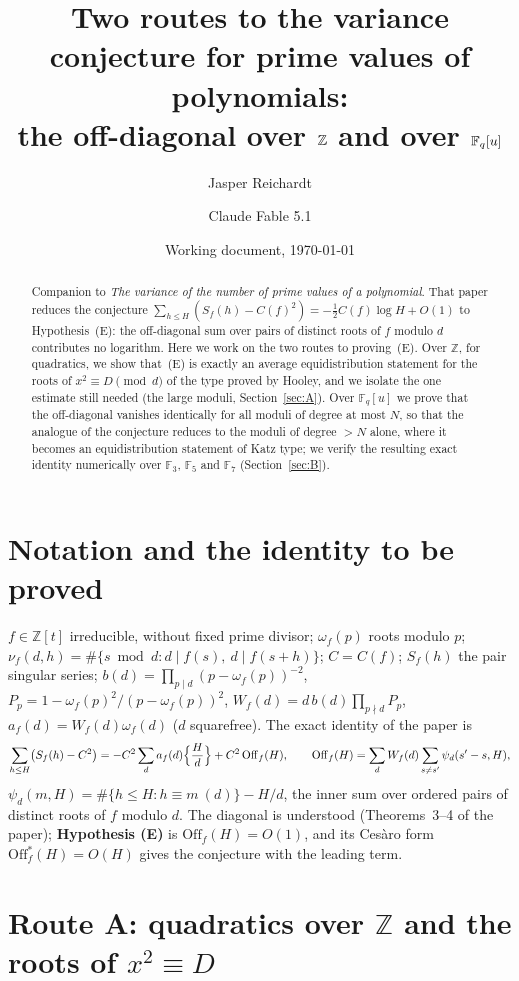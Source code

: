 \documentclass[11pt,a4paper]{article}
\title{Two routes to the variance conjecture for prime values of polynomials:\\
the off-diagonal over $\Z$ and over $\F_q[u]$}
\author{Jasper Reichardt \and Claude Fable 5.1}
\date{Working document, \today}
\newcommand{\Z}{\mathbb{Z}}
\newcommand{\F}{\mathbb{F}}
\newcommand{\Off}{\mathrm{Off}}
\begin{document}
\maketitle

\begin{abstract}
Companion to \emph{The variance of the number of prime values of a polynomial}. That paper reduces the
conjecture $\sum_{h\le H}(S_f(h)-C(f)^2)=-\tfrac12C(f)\log H+O(1)$ to Hypothesis~(E): the off-diagonal
sum over pairs of distinct roots of $f$ modulo $d$ contributes no logarithm. Here we work on the two
routes to proving~(E). Over $\Z$, for quadratics, we show that~(E) is exactly an average
equidistribution statement for the roots of $x^2\equiv D\pmod d$ of the type proved by Hooley, and we
isolate the one estimate still needed (the large moduli, Section~\ref{sec:A}). Over $\F_q[u]$ we prove
that the off-diagonal vanishes identically for all moduli of degree at most $N$, so that the analogue
of the conjecture reduces to the moduli of degree $>N$ alone, where it becomes an equidistribution
statement of Katz type; we verify the resulting exact identity numerically over $\F_3$, $\F_5$ and
$\F_7$ (Section~\ref{sec:B}).
\end{abstract}

\section{Notation and the identity to be proved}

$f\in\Z[t]$ irreducible, without fixed prime divisor; $\omega_f(p)$ roots modulo $p$;
$\nu_f(d,h)=\#\{s\bmod d: d\mid f(s),\ d\mid f(s+h)\}$; $C=C(f)$; $S_f(h)$ the pair singular series;
$b(d)=\prod_{p\mid d}(p-\omega_f(p))^{-2}$, $P_p=1-\omega_f(p)^2/(p-\omega_f(p))^2$,
$W_f(d)=d\,b(d)\prod_{p\nmid d}P_p$, $a_f(d)=W_f(d)\omega_f(d)$ ($d$ squarefree). The exact identity
of the paper is
\begin{equation}\label{eq:id}
\sum_{h\le H}\bigl(S_f(h)-C^2\bigr)=-C^2\sum_{d}a_f(d)\Bigl\{\frac Hd\Bigr\}+C^2\,\Off_f(H),\qquad
\Off_f(H)=\sum_dW_f(d)\sum_{s\ne s'}\psi_d(s'-s,H),
\end{equation}
$\psi_d(m,H)=\#\{h\le H:h\equiv m\ (d)\}-H/d$, the inner sum over ordered pairs of distinct roots of $f$
modulo $d$. The diagonal is understood (Theorems~3--4 of the paper); \textbf{Hypothesis (E)} is
$\Off_f(H)=O(1)$, and its Ces\`aro form $\Off^\ast_f(H)=O(H)$ gives the conjecture with the leading term.

\section{Route A: quadratics over $\Z$ and the roots of $x^2\equiv D$}\label{sec:A}
\end{document}
